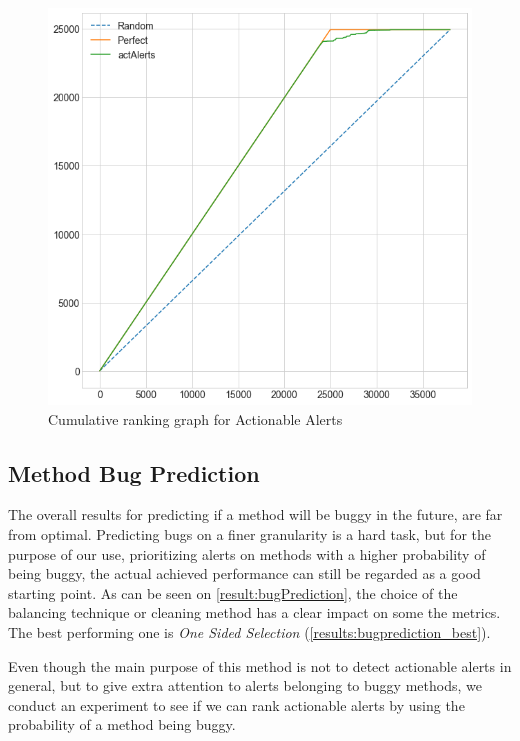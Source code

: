 \begin{figure}[H]
	\centering
	\includegraphics[scale=0.4]{./src/actAlerts/cumulative_graph_all.png}
	\caption{Cumulative ranking graph for Actionable Alerts}
	\label{results:cumulative_actalerts}
\end{figure}


\subsection{Method Bug Prediction}

The overall results for predicting if a method will be buggy in the future, are far from optimal. Predicting bugs on a finer granularity is a hard task, but for the purpose of our use, prioritizing alerts on methods with a higher probability of being buggy, the actual achieved performance can still be regarded as a good starting point.
As can be seen on \cref{result:bugPrediction}, the choice of the balancing technique or cleaning method has a clear impact on some the metrics. The best performing one is \textit{One Sided Selection} (\cref{results:bugprediction_best}). 

Even though the main purpose of this method is not to detect actionable alerts in general, but to give extra attention to alerts belonging to buggy methods, we conduct an experiment to see if we can rank actionable alerts by using the probability of a method being buggy.

